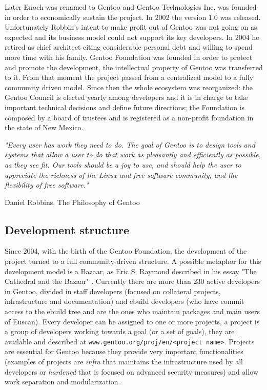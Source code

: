 Later Enoch was renamed to Gentoo and Gentoo Technologies Inc. was founded in order to economically sustain the project. In 2002 the version 1.0 was released.
Unfortunately Robbin's intent to make profit out of Gentoo was not going on as expected and its business model could not support its key developers.
In 2004 he retired as chief architect citing considerable personal debt and willing to spend more time with his family. Gentoo Foundation was founded in order to protect and promote the development, the intellectual property of Gentoo was transferred to it. From that moment the project passed from a centralized model to a fully community driven model.
Since then the whole ecosystem was reorganized: the Gentoo Council is elected yearly among developers and it is in charge to take important technical decisions and define future directions; the Foundation is composed by a board of trustees and is registered as a non-profit foundation in the state of New Mexico.

\vspace{0.8cm}
\emph{"Every user has work they need to do. The goal of Gentoo is to design tools and systems that allow a user to do that work as pleasantly and efficiently as possible, as they see fit. Our tools should be a joy to use, and should help the user to appreciate the richness of the Linux and free software community, and the flexibility of free software."}
\vspace{0.2cm}

\hfill Daniel Robbins, The Philosophy of Gentoo \cite{gentoo_philosophy}


\subsection{Development structure}
Since 2004, with the birth of the Gentoo Foundation, the development of the project turned to a full community-driven structure. A possible metaphor for this development model is a Bazaar, as Eric S. Raymond described in his essay "The Cathedral and the Bazaar" \cite{cathedral_bazaar}.
Currently there are more than 230 active developers in Gentoo, divided in staff developers (focused on collateral projects, infrastructure and documentation) and ebuild developers (who have commit access to the ebuild tree and are the ones who maintain packages and main users of Euscan).
Every developer can be assigned to one or more projects, a project is a group of developers working towards a goal (or a set of goals), they are available and described at \texttt{www.gentoo.org/proj/en/<project name>}. Projects are essential for Gentoo because they provide very important functionalities (examples of projects are \emph{infra} that maintains the infrastructure used by all developers or \emph{hardened} that is focused on advanced security measures) and allow work separation and modularization.

